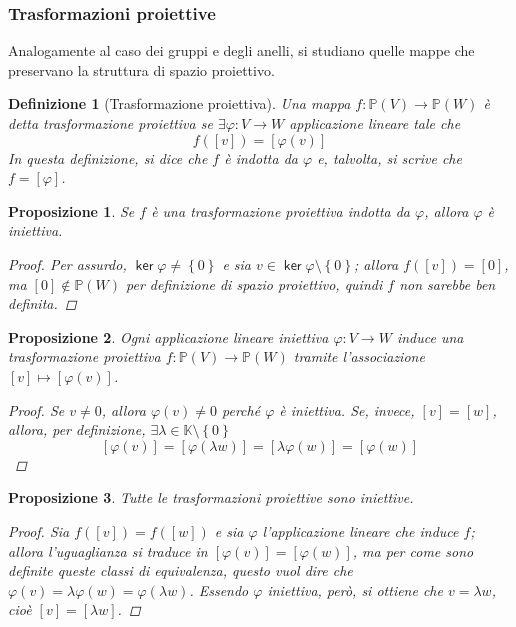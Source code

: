 \documentclass[11pt]{scrartcl}
\theoremstyle{style1}
\newtheorem{prop}{Proposizione}[section]
\newtheorem{definizione}{Definizione}[section]
\numberwithin{equation}{subsection}
\renewcommand{\operatorname}[1]{\mathop{\mathrm{\textsf{#1}}}}
\begin{document}
\subsubsection{Trasformazioni proiettive}
Analogamente al caso dei gruppi e degli anelli, si studiano quelle mappe che preservano la struttura di spazio proiettivo.
\begin{definizione}
	[Trasformazione proiettiva]
	Una mappa $f : \mathbb{P}(V)\to \mathbb{P}(W)$ \`e detta \textit{trasformazione proiettiva} se $\exists \varphi : V \to W$ applicazione lineare tale che
	\[
		f([v]) = [\varphi (v)]
	\] 
	In questa definizione, si dice che $f$ \`e \textit{indotta} da $\varphi $ e, talvolta, si scrive che $f = [\varphi ]$.
\end{definizione}
\begin{prop}
	Se $f$ \`e una trasformazione proiettiva indotta da $\varphi $, allora $\varphi $ \`e iniettiva.
	\begin{proof}
		Per assurdo, $\operatorname{ker} \varphi  \neq \left\{ 0 \right\} $ e sia $v \in \operatorname{ker} \varphi \setminus \left\{ 0 \right\} $; allora $f([v]) = [0]$, ma $[0] \not \in \mathbb{P}(W)$ per definizione di spazio proiettivo, quindi $f$ non sarebbe ben definita.
	\end{proof}
\end{prop}
\begin{prop}
	Ogni applicazione lineare iniettiva $\varphi :V\to W$ induce una trasformazione proiettiva $f: \mathbb{P}(V) \to \mathbb{P}(W)$ tramite l'associazione $[v] \mapsto [\varphi (v)]$.
	\begin{proof}
		Se $v\neq 0$, allora $\varphi (v) \neq 0$ perch\'e $\varphi $ \`e iniettiva. 
		Se, invece, $[v] = [w]$, allora, per definizione, $\exists \lambda  \in \mathbb{K}\setminus \left\{ 0 \right\}$
		\[
			[\varphi (v) ] = [\varphi (\lambda w)] = [\lambda \varphi (w)] = [\varphi (w)]
		\] 
		
	\end{proof}
\end{prop}
\begin{prop}
	Tutte le trasformazioni proiettive sono iniettive.
	\begin{proof}
		Sia $f([v]) = f([w])$ e sia $\varphi $ l'applicazione lineare che induce $f$; allora l'uguaglianza si traduce in $[\varphi (v)]=[\varphi (w)]$, ma per come sono definite queste classi di equivalenza, questo vuol dire che $\varphi (v) = \lambda \varphi (w) = \varphi (\lambda w)$.
		Essendo $\varphi $ iniettiva, per\`o, si ottiene che $v = \lambda w$, cio\`e $[v] = [\lambda w]$.
	\end{proof}
\end{prop}
\end{document}
